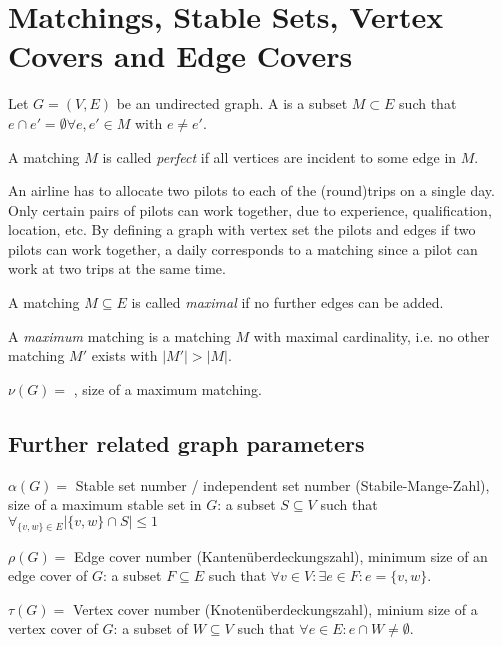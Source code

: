 \begin{lec}[2011-10-31]\end{lec}

\section{Matchings, Stable Sets, Vertex Covers and Edge Covers}

\begin{defn}
Let $G = (V, E)$ be an undirected graph. A  is a
subset $M \subset E$ such that $e \cap e' = \emptyset \forall e, e' \in M$
with $e \neq e'$.

A matching $M$ is called \emph{perfect} if all vertices are incident to
some edge in $M$.
\end{defn}

\begin{xmp+}
An airline has to allocate two pilots to each of the (round)trips on a
single day. Only certain pairs of pilots can work together, due to
experience, qualification, location, etc. By defining a graph with vertex
set the pilots and edges if two pilots can work together, a daily
corresponds to a matching since a pilot can work at two trips at the same
time.
\end{xmp+}

\begin{defn}
A matching $M \subseteq E$ is called \emph{maximal} if no further edges can
be added.

A \emph{maximum} matching is a matching $M$ with maximal cardinality, i.e.
no other matching $M'$ exists with $|M'| > |M|$.

$\nu(G) =$ , size of a maximum matching.
\end{defn}

\subsection{Further related graph parameters}
$\alpha(G) = $ Stable set number / independent set number (Stabile-Mange-Zahl), size of a maximum stable set in
$G$: a subset $S \subseteq V$ such that $\forall_{\{v, w\} \in E} \left|
\{v, w\} \cap S \right| \leq 1$

$\rho(G) = $ Edge cover number (Kantenüberdeckungszahl), minimum size of an
edge cover of $G$: a subset $F \subseteq E$ such that $\forall v \in V:
\exists e \in F: e = \{ v, w \}$.

$\tau(G) = $ Vertex cover number (Knotenüberdeckungszahl), minium size of a
vertex cover of $G$: a subset of $W \subseteq V$ such that $\forall e \in E:
e \cap W \neq \emptyset$.

